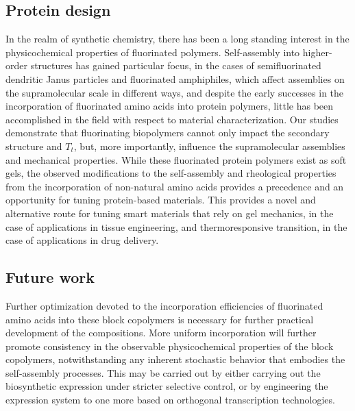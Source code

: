\begin{refsection}
\subsection{Protein design}

In the realm of synthetic chemistry, there has been a long standing interest in
the physicochemical properties of fluorinated polymers. Self-assembly into
higher-order structures has gained particular focus, in the cases of
semifluorinated dendritic Janus particles and fluorinated amphiphiles, which
affect assemblies on the supramolecular scale in different ways, and
despite the early successes in the incorporation of fluorinated amino acids into
protein polymers, little has been accomplished in the field with respect to
material characterization. Our studies demonstrate that fluorinating biopolymers
cannot only impact the secondary structure and ${T_t}$, but, more importantly,
influence the supramolecular assemblies and mechanical properties. While these
fluorinated protein polymers exist as soft gels, the observed modifications to
the self-assembly and rheological properties from the incorporation of
non-natural amino acids provides a precedence and an opportunity for tuning
protein-based materials. This provides a novel and alternative route for tuning
smart materials that rely on gel mechanics, in the case of applications in
tissue engineering, and thermoresponsive transition, in the case of applications
in drug delivery. 

\subsection{Future work}

Further optimization devoted to the incorporation efficiencies of fluorinated
amino acids into these block copolymers is necessary for further practical
development of the compositions. More uniform incorporation will further promote
consistency in the observable physicochemical properties of the block
copolymers, notwithstanding any inherent stochastic behavior that embodies the
self-assembly processes. This may be carried out by either carrying out the
biosynthetic expression under stricter selective control, or by engineering the
expression system to one more based on orthogonal transcription technologies.


\end{refsection}
